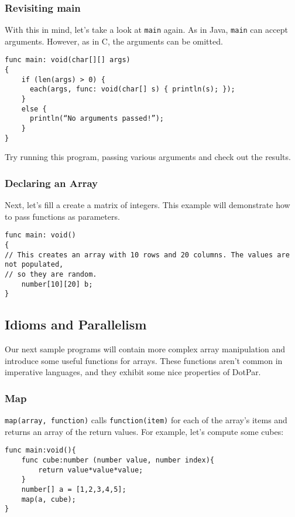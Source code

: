 \documentclass{article}
\begin{document}
\subsubsection{Revisiting main}
With this in mind, let's take a look at \verb!main! again. As in Java, \verb!main! can accept arguments. However, as in C, the arguments can be omitted.

\begin{verbatim}
func main: void(char[][] args)
{
    if (len(args) > 0) {
      each(args, func: void(char[] s) { println(s); });
    }   
    else {
      println(“No arguments passed!”);
    }
}
\end{verbatim}

Try running this program, passing various arguments and check out the results.

\subsubsection{Declaring an Array}
Next, let's fill a create a matrix of integers. This example will demonstrate how to pass functions as parameters.

\begin{verbatim}
func main: void()
{
// This creates an array with 10 rows and 20 columns. The values are not populated,
// so they are random.
    number[10][20] b;
}
\end{verbatim}

\subsection{Idioms and Parallelism}
Our next sample programs will contain more complex array manipulation and introduce some useful functions for arrays. These functions aren't common in imperative languages, and they exhibit some nice properties of DotPar.

\subsubsection{Map}
\verb!map(array, function)! calls \verb!function(item)! for each of the array's items and returns an array of the return values.  For example, let's compute some cubes:

\begin{verbatim}
func main:void(){
    func cube:number (number value, number index){
        return value*value*value;
    }
    number[] a = [1,2,3,4,5];
    map(a, cube);
}
\end{verbatim}
\end{document}
